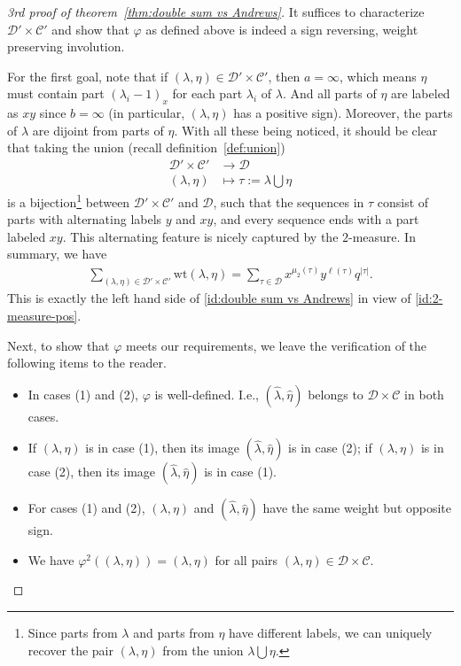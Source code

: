 \documentclass[11pt,reqno]{amsart}
\numberwithin{equation}{section}
\theoremstyle{plain}
\theoremstyle{definition}
\theoremstyle{named}
\newcommand{\abs}[1]{\left|#1\right|}
\def\cD{\mathcal{D}}
\def\cC{\mathcal{C}}
\def\la{\lambda}
\def\wt{\mathrm{wt}}
\begin{document}
\begin{proof}[3rd proof of theorem~\ref{thm:double sum vs Andrews}]
It suffices to characterize $\cD'\times\cC'$ and show that $\varphi$ as defined above is indeed a sign reversing, weight preserving involution. 

For the first goal, note that if $(\la,\eta)\in\cD'\times\cC'$, then $a=\infty$, which means $\eta$ must contain part $(\la_i-1)_x$ for each part $\la_i$ of $\la$. And all parts of $\eta$ are labeled as $xy$ since $b=\infty$ (in particular, $(\la,\eta)$ has a positive sign). Moreover, the parts of $\la$ are dijoint from parts of $\eta$. With all these being noticed, it should be clear that taking the union (recall definition~\ref{def:union})
\begin{align*}
\cD'\times\cC' &\to \cD\\
(\la,\eta) &\mapsto \tau:=\la\bigcup\eta
\end{align*}
is a bijection\footnote{Since parts from $\la$ and parts from $\eta$ have different labels, we can uniquely recover the pair $(\la,\eta)$ from the union $\la\bigcup\eta$.} between $\cD'\times\cC'$ and $\cD$, such that the sequences in $\tau$ consist of parts with alternating labels $y$ and $xy$, and every sequence ends with a part labeled $xy$. This alternating feature is nicely captured by the $2$-measure. In summary, we have
\begin{align*}
\sum_{(\la,\eta)\in\cD'\times\cC'}\wt(\la,\eta)=\sum_{\tau\in\cD} x^{\mu_2(\tau)}y^{\ell(\tau)}q^{\abs{\tau}}.
\end{align*}
This is exactly the left hand side of \eqref{id:double sum vs Andrews} in view of \eqref{id:2-measure-pos}.

Next, to show that $\varphi$ meets our requirements, we leave the verification of the following items to the reader.
\begin{itemize}
	\item In cases (1) and (2), $\varphi$ is well-defined. I.e., $(\hat{\la},\hat{\eta})$ belongs to $\cD\times\cC$ in both cases.
	\item If $(\la,\eta)$ is in case (1), then its image $(\hat{\la},\hat{\eta})$ is in case (2); if $(\la,\eta)$ is in case (2), then its image $(\hat{\la},\hat{\eta})$ is in case (1).
	\item For cases (1) and (2), $(\la,\eta)$ and $(\hat{\la},\hat{\eta})$ have the same weight but opposite sign.
	\item We have $\varphi^2((\la,\eta))=(\la,\eta)$ for all pairs $(\la,\eta)\in\cD\times\cC$.
\end{itemize}
\end{proof}
\end{document}
